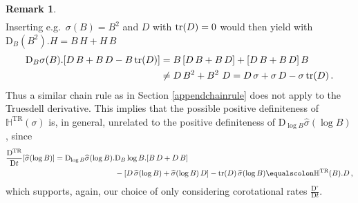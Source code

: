 \documentclass[10pt]{article}
\newcounter{theoremCounter}
\numberwithin{theoremCounter}{section}
\theoremstyle{plain}
\theoremstyle{definition}
\newtheorem{rem}[theoremCounter]{Remark}
\newcommand{\DD}{\mathrm{D}}
\DeclareMathOperator{\tr}{tr}
\DeclareMathOperator{\TR}{TR}
\def\tr{\textnormal{tr}}
\def\dd{\displaystyle}
\def\H{\mathbb{H}}
\numberwithin{equation}{section}
\begin{document}
\begin{appendix}
\begin{rem}
\begin{equation}
\begin{alignedat}{2}
	\end{alignedat}
	\end{equation}
Inserting e.g.~$\sigma(B) = B^2$ and $D$ with $\tr(D) = 0$ would then yield with $\DD_B(B^2).H = B \, H + H \, B$
	\begin{equation}
	\begin{alignedat}{2}
	\DD_B \sigma(B).[D \, B + B \, D - B \, \tr(D)] &= B \, [D \, B + B \, D] + [D \, B + B \, D] \, B \\
	&\neq D \, B^2 + B^2 \ D = D \, \sigma + \sigma \, D - \sigma \, \tr(D) \, .
	\end{alignedat}
	\end{equation}
Thus a similar chain rule as in Section \ref{appendchainrule} does not apply to the Truesdell derivative. This implies that the possible positive definiteness of $\H^{\TR}(\sigma)$ is, in general, unrelated to the positive definiteness of $\DD_{\log B} \widehat \sigma(\log B)$, since
	\begin{equation}
	\begin{alignedat}{2}
	\frac{\DD^{\TR}}{\DD t}[\widehat \sigma(\log B)] = \DD_{\log B} \widehat \sigma(\log B). &\DD_B \log B. [B \, D + D \, B] \\
	& - [D \, \widehat \sigma(\log B) + \widehat \sigma(\log B) \, D] - \tr(D) \, \widehat \sigma(\log B) \equalscolon \H^{\TR}(B).D \, ,
	\end{alignedat}
	\end{equation}
which supports, again, our choice of only considering corotational rates $\dd \frac{\DD^{\circ}}{\DD t}$.
\end{rem}
%





















\end{appendix}
\end{document}
